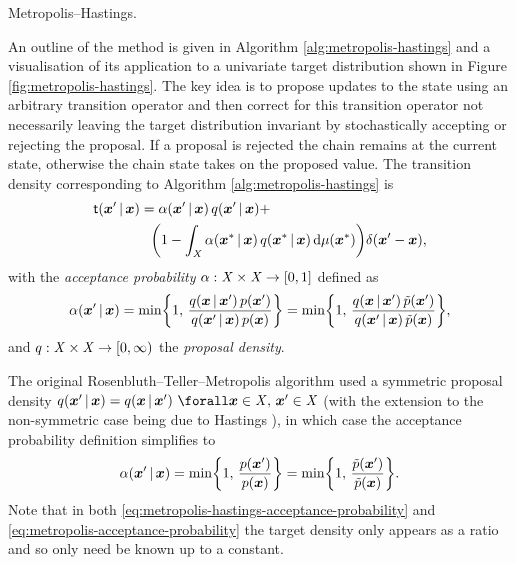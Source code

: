 \begin{algorithm}[!t]
\caption{Metropolis--Hastings.}
\label{alg:metropolis-hastings}

\end{algorithm}

An outline of the method is given in Algorithm \ref{alg:metropolis-hastings} and a visualisation of its application to a univariate target distribution shown in Figure \ref{fig:metropolis-hastings}. The key idea is to propose updates to the state using an arbitrary transition operator and then correct for this transition operator not necessarily leaving the target distribution invariant by stochastically accepting or rejecting the proposal. If a proposal is rejected the chain remains at the current state, otherwise the chain state takes on the proposed value. The transition density corresponding to Algorithm \ref{alg:metropolis-hastings} is
\begin{equation}\label{eq:metropolis-hastings-transition-density}
\begin{split}
  \trans(\vct{x}' \gvn \vct{x}) &=
  \alpha(\vct{x}'\gvn \vct{x})\,q(\vct{x}'\gvn \vct{x}) + \, \\
  &\phantom{=}  
  \lpa 1 - 
  \int_{\set{X}} \alpha(\vct{x}^*\gvn \vct{x})\,q(\vct{x}^*\gvn \vct{x}) \,\dr\mu(\vct{x}^*)
  \rpa
  \delta(\vct{x}' - \vct{x}),
\end{split}
\end{equation}
with the \emph{acceptance probability} $\alpha : \mathit{X} \times \mathit{X} \to [0,1]$ defined as
\begin{equation}\label{eq:metropolis-hastings-acceptance-probability}
  \alpha(\vct{x}'\gvn \vct{x}) =
  \min\lbr 1,\, \frac{q(\vct{x}\gvn\vct{x}')\,\tgtdens(\vct{x}')}{q(\vct{x}'\gvn\vct{x})\,\tgtdens(\vct{x})} \rbr =
  \min\lbr 1,\, \frac{q(\vct{x}\gvn\vct{x}')\,\utgtdens(\vct{x}')}{q(\vct{x}'\gvn\vct{x})\,\utgtdens(\vct{x})} \rbr,
\end{equation}
and  $q : \mathit{X} \times \mathit{X} \to [0, \infty)$ the  \emph{proposal density}. %

The original Rosenbluth--Teller--Metropolis algorithm used a symmetric proposal density $q(\vct{x}' \gvn \vct{x}) = q(\vct{x} \gvn \vct{x}') ~\forall \vct{x} \in \set{X},\,\vct{x}'\in\set{X}$ (with the extension to the non-symmetric case being due to Hastings \citep{hastings1970monte}), in which case the acceptance probability definition simplifies to
\begin{equation}\label{eq:metropolis-acceptance-probability}
  \alpha(\vct{x}'\gvn \vct{x}) =
  \min\lbr 1,\, \frac{\tgtdens(\vct{x}')}{\tgtdens(\vct{x})} \rbr =
  \min\lbr 1,\, \frac{\utgtdens(\vct{x}')}{\utgtdens(\vct{x})} \rbr.
\end{equation}
Note that in both \eqref{eq:metropolis-hastings-acceptance-probability} and \eqref{eq:metropolis-acceptance-probability} the target density only appears as a ratio and so only need be known up to a constant.


